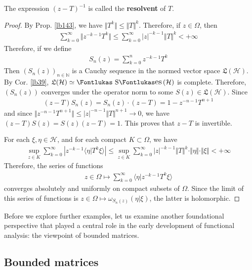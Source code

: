 \documentclass[12pt,b5paper,notitlepage]{article}
\theoremstyle{definition}
\theoremstyle{plain}
\DeclareMathOperator{\Ses}{\text{\Fontlukas S}\text{\kern -0pt {\Fontlukas\large es}}\,}
\newcommand{\fk}{\mathfrak}
\newcommand{\bk}[1]{\langle {#1}\rangle}
\newcommand{\Nbb}{\mathbb N}
\newcommand{\MH}{\mathcal H}
\numberwithin{equation}{section}
\begin{document}
The expression $(z-T)^{-1}$ is called the \textbf{resolvent} of $T$. 

\begin{proof}
By Prop. \ref{lb143}, we have $\Vert T^k\Vert\leq\Vert T\Vert^k$. Therefore, if $z\in\Omega$, then
\begin{align*}
\sum_{k=0}^\infty \Vert z^{-k-1}T^k\Vert\leq\sum_{k=0}^\infty |z|^{-k-1}\Vert T\Vert^k<+\infty
\end{align*}
Therefore, if we define
\begin{align}
S_n(z)=\sum_{k=0}^nz^{-k-1}T^k
\end{align}
Then $(S_n(z))_{n\in\Nbb}$ is a Cauchy sequence in the normed vector space $\fk L(\MH)$. By Cor. \ref{lb39}, $\fk L(\MH)\simeq\Ses(\MH)$ is complete. Therefore, $(S_n(z))$ converges under the operator norm to some $S(z)\in\fk L(\MH)$. Since
\begin{align*}
(z-T)S_n(z)=S_n(z)\cdot (z-T)=1-z^{-n-1}T^{n+1}
\end{align*}
and since $\Vert z^{-n-1}T^{n+1}\Vert\leq |z|^{-n-1}\Vert T\Vert^{n+1}\rightarrow0$, we have $(z-T)S(z)=S(z)(z-T)=1$. This proves that $z-T$ is invertible.

For each $\xi,\eta\in\MH$, and for each compact $K\subset \Omega$, we have
\begin{align*}
\sup_{z\in K}\sum_{k=0}^\infty |z^{-k-1}\bk{\eta|T^k\xi}|\leq \sup_{z\in K}\sum_{k=0}^\infty |z|^{-k-1}\Vert T\Vert^k\cdot\Vert\eta\Vert\cdot\Vert\xi\Vert<+\infty
\end{align*}
Therefore, the series of functions
\begin{align*}
z\in\Omega\mapsto \sum_{k=0}^\infty\bk{\eta|z^{-k-1}T^k\xi}
\end{align*}
converges absolutely and uniformly on compact subsets of $\Omega$. Since the limit of this series of functions is $z\in\Omega\mapsto\omega_{S_n(z)}(\eta|\xi)$, the latter is holomorphic.
\end{proof}



Before we explore further examples, let us examine another foundational perspective that played a central role in the early development of functional analysis: the viewpoint of bounded matrices.



\subsection{Bounded matrices}\label{lb154}
\end{document}
